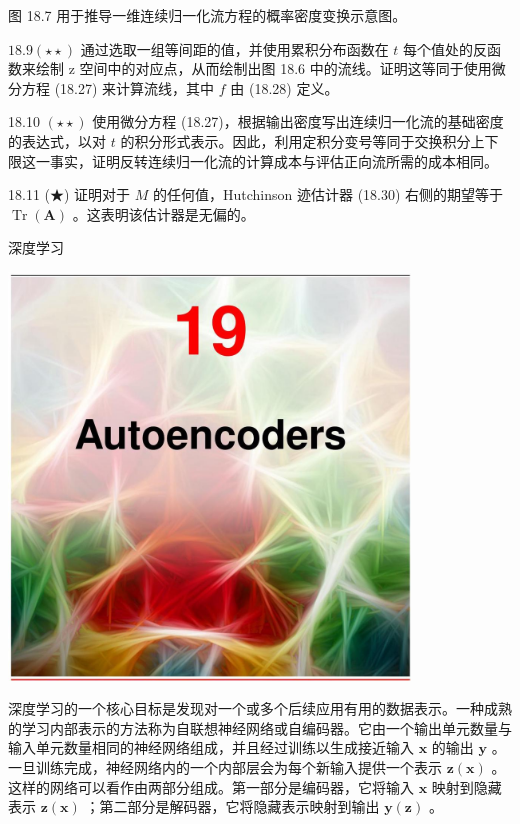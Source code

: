 \documentclass[10pt]{report}
\begin{document}
图 18.7 用于推导一维连续归一化流方程的概率密度变换示意图。

\({18.9}\left( {\star  \star  }\right)\) 通过选取一组等间距的值，并使用累积分布函数在 \(t\) 每个值处的反函数来绘制 z 空间中的对应点，从而绘制出图 18.6 中的流线。证明这等同于使用微分方程 (18.27) 来计算流线，其中 \(f\) 由 (18.28) 定义。

18.10 \(\left( {\star  \star  }\right)\) 使用微分方程 (18.27)，根据输出密度写出连续归一化流的基础密度的表达式，以对 \(t\) 的积分形式表示。因此，利用定积分变号等同于交换积分上下限这一事实，证明反转连续归一化流的计算成本与评估正向流所需的成本相同。

18.11 (★) 证明对于 \(M\) 的任何值，Hutchinson 迹估计器 (18.30) 右侧的期望等于 \(\operatorname{Tr}\left( \mathbf{A}\right)\) 。这表明该估计器是无偏的。

深度学习

\begin{center}
\includegraphics[max width=0.8\textwidth]{images/0194e279-9b28-703a-88f4-c3ac21e2010d_582_474_349_1074_1088_0.jpg}
\end{center}
\hspace*{3em} 

深度学习的一个核心目标是发现对一个或多个后续应用有用的数据表示。一种成熟的学习内部表示的方法称为自联想神经网络或自编码器。它由一个输出单元数量与输入单元数量相同的神经网络组成，并且经过训练以生成接近输入 \(\mathbf{x}\) 的输出 \(\mathbf{y}\) 。一旦训练完成，神经网络内的一个内部层会为每个新输入提供一个表示 \(\mathbf{z}\left( \mathbf{x}\right)\) 。这样的网络可以看作由两部分组成。第一部分是编码器，它将输入 \(\mathbf{x}\) 映射到隐藏表示 \(\mathbf{z}\left( \mathbf{x}\right)\) ；第二部分是解码器，它将隐藏表示映射到输出 \(\mathbf{y}\left( \mathbf{z}\right)\) 。
\end{document}

